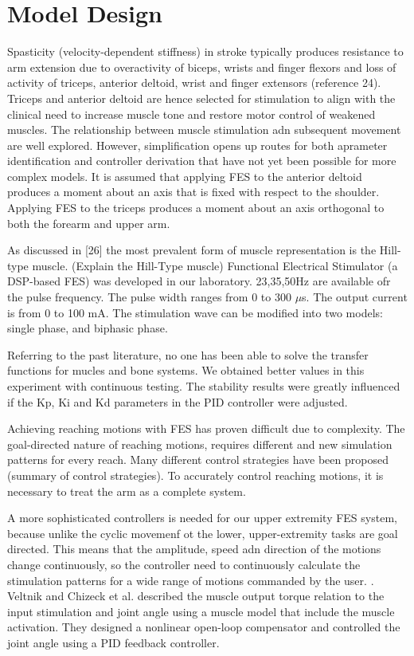 \chapter{Model Design}
Spasticity (velocity-dependent stiffness) in stroke typically produces resistance to arm extension due to overactivity of biceps, wrists and finger flexors and loss of activity of triceps, anterior deltoid, wrist and finger extensors (reference 24). \cite{IOL}
Triceps and anterior deltoid are hence selected for stimulation to align with the clinical need to increase muscle tone and restore motor control of weakened muscles. 
The relationship between muscle stimulation adn subsequent movement are well explored. However, simplification opens up routes for both aprameter identification and controller derivation that have not yet been possible for more complex models. \cite{IOL}
It is assumed that applying FES to the anterior deltoid produces a moment about an axis that is fixed with respect to the shoulder. Applying FES to the triceps produces a moment about an axis orthogonal to both the forearm and upper arm.\cite{IOL}

As discussed in [26] the most prevalent form of muscle representation is the Hill-type muscle. (Explain the Hill-Type muscle)
Functional Electrical Stimulator (a DSP-based FES) was developed in our laboratory. 23,35,50Hz are available ofr the pulse frequency. 
The pulse width ranges from 0 to 300 $\mu$s. The output current is from 0 to 100 mA. The stimulation wave can be modified into two models: single phase, and biphasic phase. \cite{NNPID}



Referring to the past literature, no one has been able to solve the transfer functions for mucles and bone systems. We obtained better values in this experiment with continuous testing. The stability results were greatly influenced if the Kp, Ki and Kd parameters in the PID controller were adjusted. \cite{NNPID}

Achieving reaching motions with FES has proven difficult due to complexity. The goal-directed nature of reaching motions, requires different and new simulation patterns for every reach. Many different control strategies have been proposed (summary of control strategies). To accurately control reaching motions, it is necessary to treat the arm as a complete system. 




A more sophisticated controllers is needed for our upper extremity FES system, because unlike the cyclic movemenf ot the lower, upper-extremity tasks are goal directed. This means that the amplitude, speed adn direction of the motions change continuously, so the controller need to continuously calculate the stimulation patterns for a wide range of motions commanded by the user. \cite{CFF}. 
Veltnik and Chizeck et al. described the muscle output torque relation to the input stimulation and joint angle using a muscle model that include the muscle activation. They designed a nonlinear open-loop compensator and controlled the joint angle using a PID feedback controller. \cite{NNPID}



